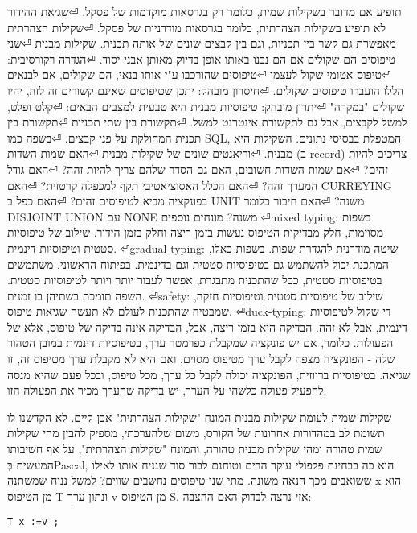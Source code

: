 \begin{טבלא}[!htbp]
      תופיע אם מדובר בשקילות שמית, כלומר רק בגרסאות מוקדמות של פסקל.
⏎שגיאת ההידור לא תופיע בשקילות הצהרתית, כלומר בגרסאות מודרניות של פסקל.
⏎שקילות הצהרתית מאפשרת גם קשר בין תכניות, וגם בין קבצים שונים של אותה תכנית.
      שקילות מבנית
⏎שני טיפוסים הם שקולים אם הם נבנו באותו אופן בדיוק מאותן אבני יסוד.
⏎הגדרה רקורסיבית:
⏎טיפוס אטומי שקול לעצמו
⏎טיפוסים שהורכבו ע"י אותו בנאי, הם שקולים, אם לבנאים הללו הועברו טיפוסים שקולים.
⏎חיסרון מובהק: יתכן שטיפוסים שאינם קשורים זה לזה, יהיו שקולים "במקרה"
⏎יתרון מובהק: טיפוסיות מבנית היא טבעית למצבים הבאים:
⏎קלט ופלט, למשל לקבצים, אבל גם לתקשורת אינטרנט למשל.
⏎תקשורת בין שתי תכניות
⏎תקשורת בין תכנית המחולקת על פני קבצים.
⏎בשפה כמו SQL, המטפלת בבסיסי נתונים. השקילות היא מבנית.
⏎וריאנטים שונים של שקילות מבנית
⏎האם שמות השדות (ב record) צריכים להיות זהים?
⏎אם שמות השדות חשובים, האם גם הסדר שלהם צריך להיות זהה?
⏎האם גודל המערך זהה?
⏎האם הכלל האסוציאטיבי תקף למכפלה קרטזית?
⏎האם CURREYING בפונקציה מביא לטיפוסים זהים?
⏎האם כפל ב UNIT משנה?
⏎האם חיבור כלומר DISJOINT UNION עם NONE משנה?
      מונחים נוספים
⏎mixed typing: בשפות מסוימות, חלק מבדיקות הטיפוס נעשות בזמן ריצה וחלק בזמן הידור. שילוב של טיפוסיות סטטית וטיפוסיות דינמית.
⏎gradual typing: שיטה מודרנית להגדרת שפות. בשפות כאלו, המתכנת יכול להשתמש גם בטיפוסיות סטטית וגם בדינמית. בפיתוח הראשוני, משתמשים בטיפוסיות סטטית, ככל שהתכנית מתבגרת, אפשר לעבור יותר ויותר לטיפוסיות סטטית. השפה תומכת בשתיהן בו זמנית.
⏎safety: שילוב של טיפוסיות סטטית וטיפוסיות חזקה, שמבטיח שהתכנית לעולם לא תעשה שגיאות טיפוס.
⏎duck-typing: די שקול לטיפוסיות דינמית, אבל לא זהה. הבדיקה היא בזמן ריצה, אבל, הבדיקה אינה בדיקה של טיפוס, אלא של הפעולות. כלומר, אם יש פונקציה שמקבלת כפרמטר ערך, בטיפוסיות דינמית במובן הטהור שלה - הפונקציה מצפה לקבל ערך מטיפוס מסוים, ואם היא לא מקבלת ערך מטיפוס זה, זו שגיאה. בטיפוסיות ברווזית, הפונקציה יכולה לקבל כל ערך, מכל טיפוס, ובכל פעם שהיא מנסה להפעיל פעולה כלשהי על הערך, יש בדיקה שהערך מכיר את הפעולה הזו.

      שקילות שמית לעומת שקילות מבנית
      המונח "שקילות הצהרתית" אכן קיים. לא הקדשנו לו תשומת לב במהדורות אחרונות של הקורס, משום שלהערכתי, מספיק להבין מהי שקילות שמית טהורה ומהי שקילות מבנית טהורה, והמונח "שקילות הצהרתית", על אף חשיבותו המעשית בְּPascal, הוא כה בבחינת פלפולי עוקר הרים וטוחנם לבור סוד שנניח אותו לאילו ששואבים מכך הנאה משונה.
      מתי שני טיפוסים נחשבים שווים? למשל נניח שמשתנה x הוא מן הטיפוס T ונתון ערך v מן הטיפוס S. אזי נרצה לבדוק האם ההצבה:

\begin{verbatim}
T x :=v ;


\end{verbatim}
\end{טבלא}
